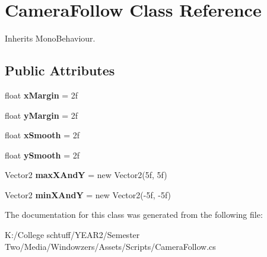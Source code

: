 \hypertarget{class_camera_follow}{}\section{Camera\+Follow Class Reference}
\label{class_camera_follow}


Inherits Mono\+Behaviour.

\subsection*{Public Attributes}
\begin{DoxyCompactItemize}
\item 
\mbox{\label{class_camera_follow_a2df8d813fb74253311936004c7c44b2d}} 
float {\bfseries x\+Margin} = 2f
\item 
\mbox{\label{class_camera_follow_a01a4a7cbd824aae84265248924a5c589}} 
float {\bfseries y\+Margin} = 2f
\item 
\mbox{\label{class_camera_follow_aba2142b460f986abe15f3f02001d7a84}} 
float {\bfseries x\+Smooth} = 2f
\item 
\mbox{\label{class_camera_follow_a23adf0ee8570ff43e782a1a1ea403cec}} 
float {\bfseries y\+Smooth} = 2f
\item 
\mbox{\label{class_camera_follow_a745fb49ca2157bf3fe1e6f6621b9d75d}} 
Vector2 {\bfseries max\+X\+AndY} = new Vector2(5f, 5f)
\item 
\mbox{\label{class_camera_follow_ad6d84102f1da82ee18eddbddfbfb1668}} 
Vector2 {\bfseries min\+X\+AndY} = new Vector2(-\/5f, -\/5f)
\end{DoxyCompactItemize}


The documentation for this class was generated from the following file\+:\begin{DoxyCompactItemize}
\item 
K\+:/\+College schtuff/\+Y\+E\+A\+R2/\+Semester Two/\+Media/\+Windowzers/\+Assets/\+Scripts/Camera\+Follow.\+cs\end{DoxyCompactItemize}
